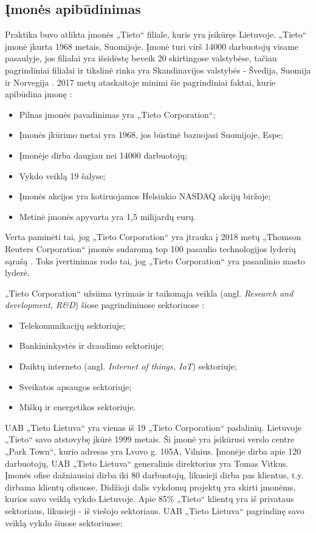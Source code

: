 \documentclass{VUMIFPSbakalaurinis}
\begin{document}
\subsection{Įmonės apibūdinimas}
Praktika buvo atlikta įmonės „Tieto“ filiale, kuris yra įsikūręs Lietuvoje. „Tieto“ įmonė įkurta 1968 metais, Suomijoje. Įmonė turi virš 14000 darbuotojų visame pasaulyje, jos filialai yra išsidėstę beveik 20 skirtingose valstybėse, tačiau pagrindiniai filialai ir tikslinė rinka yra Skandinavijos valstybės - Švedija, Suomija ir Norvegija \cite{TIETO}. 2017 metų ataskaitoje minimi šie pagrindiniai faktai, kurie apibūdina įmonę \cite{TIETO}:
\begin{itemize}
    \item Pilnas įmonės pavadinimas yra „Tieto Corporation“;
    \item Įmonės įkūrimo metai yra 1968, jos būstinė bazuojasi Suomijoje, Espe;
    \item Įmonėje dirba daugiau nei 14000 darbuotojų;
    \item Vykdo veiklą 19 šalyse;
    \item Įmonės akcijos yra kotiruojamos Helsinkio NASDAQ akcijų biržoje;
    \item Metinė įmonės apyvarta yra 1,5 milijardų eurų.
\end{itemize}

Verta paminėti tai, jog  „Tieto Corporation“ yra įtrauka į 2018 metų „Thomson Reuters Corporation“ įmonės sudaromą top 100 pasaulio technologijos lyderių sąrašą \cite{List}. Toks įvertinimas rodo tai, jog „Tieto Corporation“ yra pasaulinio masto lyderė.

„Tieto Corporation“ užsiima tyrimais ir taikomąja veikla (angl. \textit{Research and development, R&D}) šiose pagrindiniuose sektoriuose \cite{TIETO}:
\begin{itemize}
    \item Telekomunikacijų sektoriuje;
    \item Bankininkystės ir draudimo sektoriuje;
    \item Daiktų interneto (angl. \textit{Internet of things, IoT}) sektoriuje;
    \item Sveikatos apsaugos sektoriuje;
    \item Miškų ir energetikos sektoriuje.
\end{itemize}

UAB „Tieto Lietuva“ yra vienas iš 19 „Tieto Corporation“ padalinių. Lietuvoje „Tieto“ savo atstovybę įkūrė 1999 metais. Ši įmonė yra įsikūrusi verslo centre „Park Town“, kurio adresas yra Lvovo g. 105A, Vilnius. Įmonėje dirba apie 120 darbuotojų, UAB „Tieto Lietuva“ generalinis direktorius yra Tomas Vitkus. Įmonės ofise dažniausiai dirba iki 80 darbuotojų, likusieji dirba pas klientus, t.y. dirbama klientų ofisuose. Didžioji dalis vykdomų projektų yra skirti įmonėms, kurios savo veiklą vykdo Lietuvoje. Apie 85\% „Tieto“ klientų yra iš privataus sektoriaus, likusieji - iš viešojo sektoriaus. UAB „Tieto Lietuva“ pagrindinę savo veiklą vykdo šiuose sektoriuose: 
\end{document}

